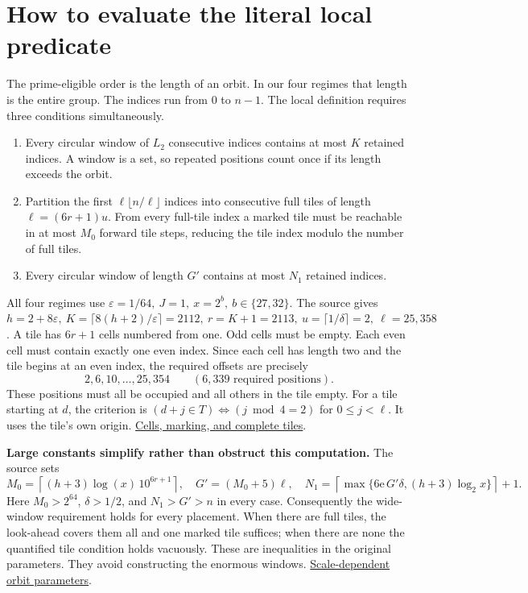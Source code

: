 \documentclass[11pt,letterpaper]{article}
\newcommand{\orig}[3]{\href{https://github.com/nousentllc/riemann-hypothesis/blob/40e56bab026552e089d7afcfeff08d2defb9c005/src/#1.lean\#L#2}{#3}}
\newcommand{\pp}[1]{\par\medskip\noindent\textbf{#1}\enspace}
\newcommand{\nextsection}[1]{\clearpage\section{#1}}
\begin{document}
\nextsection{How to evaluate the literal local predicate}
The prime-eligible order is the length of an orbit. In our four regimes that length is the entire group. The indices run from \(0\) to \(n-1\). The local definition requires three conditions simultaneously.
\begin{enumerate}
\item Every circular window of \(L_2\) consecutive indices contains at most \(K\) retained indices. A window is a set, so repeated positions count once if its length exceeds the orbit.
\item Partition the first \(\ell\lfloor n/\ell\rfloor\) indices into consecutive full tiles of length \(\ell=(6r+1)u\). From every full-tile index a marked tile must be reachable in at most \(M_0\) forward tile steps, reducing the tile index modulo the number of full tiles.
\item Every circular window of length \(G'\) contains at most \(N_1\) retained indices.
\end{enumerate}
All four regimes use \(\varepsilon=1/64,\ J=1,\ x=2^b,\ b\in\{27,32\}\). The source gives \(h=2+8\varepsilon,\ K=\lceil8(h+2)/\varepsilon\rceil=2112,\ r=K+1=2113,\ u=\lceil 1/\delta\rceil=2,\ \ell=25{,}358\). A tile has \(6r+1\) cells numbered from one. Odd cells must be empty. Each even cell must contain exactly one even index. Since each cell has length two and the tile begins at an even index, the required offsets are precisely
\[
  2,6,10,\ldots,25{,}354 \qquad (6{,}339\text{ required positions}).
\]
These positions must all be occupied and all others in the tile empty. For a tile starting at \(d\), the criterion is \((d+j\in T)\iff(j\bmod4=2)\) for \(0\le j<\ell\). It uses the tile's own origin. \orig{Formalism/SubspaceCounting/GoodOrbitIntervalTileCondition}{10}{Cells, marking, and complete tiles}.

\pp{Large constants simplify rather than obstruct this computation.} The source sets
\[
 M_0=\left\lceil(h+3)\log(x)\,10^{6r+1}\right\rceil,\quad
 G'=(M_0+5)\ell,\quad
 N_1=\left\lceil\max\{6\mathrm e\,G'\delta,(h+3)\log_2x\}\right\rceil+1 .
\]
Here \(M_0>2^{64}\), \(\delta>1/2\), and \(N_1>G'>n\) in every case. Consequently the wide-window requirement holds for every placement. When there are full tiles, the look-ahead covers them all and one marked tile suffices; when there are none the quantified tile condition holds vacuously. These are inequalities in the original parameters. They avoid constructing the enormous windows. \orig{Formalism/SharpRestriction/GrowthBounds/UnramifiedQuadraticSetting}{237}{Scale-dependent orbit parameters}.
\end{document}
